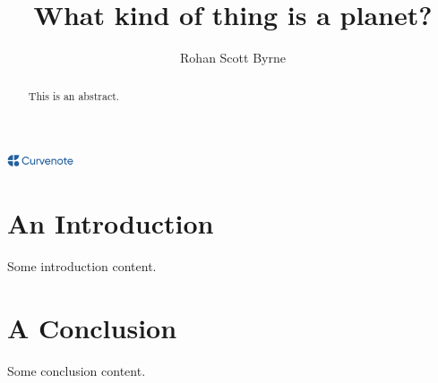 \documentclass{article}
\title{What kind of thing is a planet?}
\author{Rohan Scott Byrne}
\date{\displaydate{articleDate}}
\newcommand{\logo}{
  \href{https://curvenote.com}{\includegraphics[width=2cm]{curvenote.png}}
}
\begin{document}
\maketitle
\begin{abstract}This is an abstract.\end{abstract}\begin{center}\logo\end{center}


\section{An Introduction}

Some introduction content.

\section{A Conclusion}

Some conclusion content.
\end{document}
